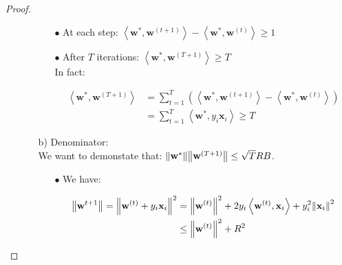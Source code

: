 \documentclass[../../main/main.tex]{subfiles}
\begin{document}
\begin{proof}
\begin{itemize}
\begin{itemize}
\begin{itemize}
                        \item[$\bullet$] At each step: \( \left\langle \mathbf{w}^*, \mathbf{w}^{(t+1)} \right\rangle - \left\langle \mathbf{w}^*, \mathbf{w}^{(t)} \right\rangle \ge 1 \)

                        \item[$\bullet$] After \( T \) iterations: \( \left\langle \mathbf{w}^*, \mathbf{w}^{(T+1)} \right\rangle \ge T \)\\
                            In fact:

                            \begin{align}
                                \left\langle \mathbf{w}^*, \mathbf{w}^{(T+1)} \right\rangle
                                &=
                                \sum_{t=1}^{T} \left( \left\langle \mathbf{w}^*, \mathbf{w}^{(t+1)} \right\rangle - \left\langle \mathbf{w}^*, \mathbf{w}^{(t)} \right\rangle \right) \nonumber \\
                                &=
                                \sum_{t=1}^{T} \left\langle \mathbf{w}^*, y_i \mathbf{x}_i \right\rangle
                                \ge
                                T
                                \label{eq:C5_T1P_3}
                            \end{align}
                    \end{itemize}

                \item[b)] Denominator:\\
                    We want to demonstate that: \( \norm{\mathbf{w}^*} \norm{\mathbf{w}^{(T+1)}} \le \sqrt{T} RB \).
                    \begin{itemize}
                        \item[$\bullet$] We have:

                            \begin{align}
                                \norm{\mathbf{w}^{t+1}}
                                =
                                \norm{\mathbf{w}^{(t)} + y_i \mathbf{x}_i}^2
                                &=
                                \norm{\mathbf{w}^{(t)}}^2 + 2 y_i \left\langle \mathbf{w}^{(t)}, \mathbf{x}_i \right\rangle + y_i^2 \norm{\mathbf{x}_i}^2   \nonumber   \\
                                &\le
                                \norm{\mathbf{w}^{(t)}}^2 + R^2
                                \label{eq:C5_T1P_4}
                            \end{align}


\end{itemize}
\end{itemize}
\end{itemize}
\end{proof}
\end{document}
